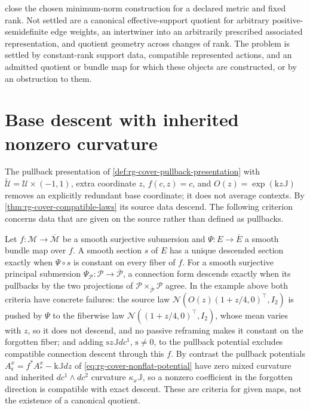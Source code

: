  close
the chosen minimum-norm construction for a declared metric and fixed rank. Not
settled are a canonical effective-support quotient for arbitrary
positive-semidefinite edge weights, an intertwiner into an arbitrarily prescribed
associated representation, and quotient geometry across changes of rank. The
problem is settled by constant-rank support data, compatible represented actions,
and an admitted quotient or bundle map for which these objects are constructed,
or by an obstruction to them.

\section{Base descent with inherited nonzero curvature}
\label{sec:rg-cover-base-descent}

The pullback presentation of \cref{def:rg-cover-pullback-presentation} with
\(\widetilde{\mathcal U}=\mathcal U\times(-1,1)\), extra coordinate \(z\),
\(f(c,z)=c\), and \(O(z)=\exp(\mathrm kz\mathbb J)\) removes an explicitly
redundant base coordinate; it does not average contexts. By
\cref{thm:rg-cover-compatible-laws} its source data descend. The following
criterion concerns data that are given on the source rather than defined as
pullbacks.

Let \(f:\mathcal M\to\overline{\mathcal M}\) be a smooth surjective submersion and
\(\Psi:E\to\overline E\) a smooth bundle map over \(f\). A smooth section \(s\) of
\(E\) has a unique descended section exactly when \(\Psi\circ s\) is constant on
every fiber of \(f\). For a smooth surjective principal submersion
\(\Psi_{\mathscr P}:\mathscr P\to\overline{\mathscr P}\), a connection form
descends exactly when its pullbacks by the two projections of
\(\mathscr P\times_{\overline{\mathscr P}}\mathscr P\) agree. In the example above
both criteria have concrete failures: the source law
\(\mathcal N(O(z)(1+z/4,0)^\top,I_2)\) is pushed by \(\Psi\) to the fiberwise law
\(\mathcal N((1+z/4,0)^\top,I_2)\), whose mean varies with \(z\), so it does not
descend, and no passive reframing makes it constant on the forgotten fiber; and
adding \(\mathrm sz\mathbb Jdc^1\), \(\mathrm s\ne0\), to the pullback potential
excludes compatible connection descent through this \(f\). By contrast the
pullback potentials \(A^x_{\mathrm s}=f^*A^x_*-\mathrm k\mathbb Jdz\) of
\eqref{eq:rg-cover-nonflat-potential} have zero mixed curvature and inherited
\(dc^1\wedge dc^2\) curvature \(\kappa_x\mathbb J\), so a nonzero coefficient in the
forgotten direction is compatible with exact descent. These are criteria for
given maps, not the existence of a canonical quotient. 

